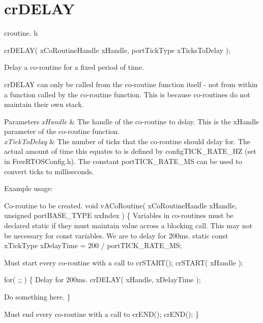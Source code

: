 \hypertarget{group__cr_d_e_l_a_y}{\section{cr\-D\-E\-L\-A\-Y}
\label{group__cr_d_e_l_a_y}
}
croutine. h 
\begin{DoxyPre}
 crDELAY( xCoRoutineHandle xHandle, portTickType xTicksToDelay );\end{DoxyPre}


Delay a co-\/routine for a fixed period of time.

cr\-D\-E\-L\-A\-Y can only be called from the co-\/routine function itself -\/ not from within a function called by the co-\/routine function. This is because co-\/routines do not maintain their own stack.


\begin{DoxyParams}{Parameters}
{\em x\-Handle} & The handle of the co-\/routine to delay. This is the x\-Handle parameter of the co-\/routine function.\\
\hline
{\em x\-Tick\-To\-Delay} & The number of ticks that the co-\/routine should delay for. The actual amount of time this equates to is defined by config\-T\-I\-C\-K\-\_\-\-R\-A\-T\-E\-\_\-\-H\-Z (set in Free\-R\-T\-O\-S\-Config.\-h). The constant port\-T\-I\-C\-K\-\_\-\-R\-A\-T\-E\-\_\-\-M\-S can be used to convert ticks to milliseconds.\\
\hline
\end{DoxyParams}
Example usage\-: 
\begin{DoxyPre}
Co-routine to be created.
 void vACoRoutine( xCoRoutineHandle xHandle, unsigned portBASE\_TYPE uxIndex )
 \{
Variables in co-routines must be declared static if they must maintain value across a blocking call.
This may not be necessary for const variables.
We are to delay for 200ms.
 static const xTickType xDelayTime = 200 / portTICK\_RATE\_MS;\end{DoxyPre}



\begin{DoxyPre}Must start every co-routine with a call to crSTART();
     crSTART( xHandle );\end{DoxyPre}



\begin{DoxyPre}     for( ;; )
     \{
Delay for 200ms.
        crDELAY( xHandle, xDelayTime );\end{DoxyPre}



\begin{DoxyPre}Do something here.
     \}\end{DoxyPre}



\begin{DoxyPre}Must end every co-routine with a call to crEND();
     crEND();
 \}\end{DoxyPre}
 